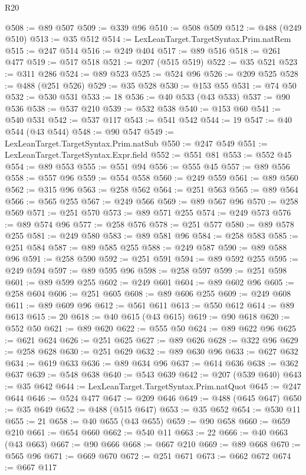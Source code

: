 \begin{lexlean}{R20}
\begin{coremodule}
@508 := @89 @507
@509 := @339 @96
@510 := @508 @509
@512 := @488 (@249 @510)
@513 := @35 @512
@514 := LexLeanTarget.TargetSyntax.Prim.natRem
@515 := @247 @514
@516 := @249 @404
@517 := @89 @516
@518 := @261 @477
@519 := @517 @518
@521 := @207 (@515 @519)
@522 := @35 @521
@523 := @311 @286
@524 := @89 @523
@525 := @524 @96
@526 := @209 @525
@528 := @488 (@251 @526)
@529 := @35 @528
@530 := @153 @55
@531 := @74 @50
@532 := @530 @531
@533 := 18
@536 := @40 @533 (@43 @533)
@537 := @90 @536
@538 := @537 @210
@539 := @532 @538
@540 := @153 @60
@541 := @540 @531
@542 := @537 @117
@543 := @541 @542
@544 := 19
@547 := @40 @544 (@43 @544)
@548 := @90 @547
@549 := LexLeanTarget.TargetSyntax.Prim.natSub
@550 := @247 @549
@551 := LexLeanTarget.TargetSyntax.Expr.field
@552 := @551 @81
@553 := @552 @45
@554 := @89 @553
@555 := @551 @94
@556 := @555 @45
@557 := @89 @556
@558 := @557 @96
@559 := @554 @558
@560 := @249 @559
@561 := @89 @560
@562 := @315 @96
@563 := @258 @562
@564 := @251 @563
@565 := @89 @564
@566 := @565 @255
@567 := @249 @566
@569 := @89 @567 @96
@570 := @258 @569
@571 := @251 @570
@573 := @89 @571 @255
@574 := @249 @573
@576 := @89 @574 @96
@577 := @258 @576
@578 := @251 @577
@580 := @89 @578 @255
@581 := @249 @580
@583 := @89 @581 @96
@584 := @258 @583
@585 := @251 @584
@587 := @89 @585 @255
@588 := @249 @587
@590 := @89 @588 @96
@591 := @258 @590
@592 := @251 @591
@594 := @89 @592 @255
@595 := @249 @594
@597 := @89 @595 @96
@598 := @258 @597
@599 := @251 @598
@601 := @89 @599 @255
@602 := @249 @601
@604 := @89 @602 @96
@605 := @258 @604
@606 := @251 @605
@608 := @89 @606 @255
@609 := @249 @608
@611 := @89 @609 @96
@612 := @561 @611
@613 := @550 @612
@614 := @89 @613
@615 := 20
@618 := @40 @615 (@43 @615)
@619 := @90 @618
@620 := @552 @50
@621 := @89 @620
@622 := @555 @50
@624 := @89 @622 @96
@625 := @621 @624
@626 := @251 @625
@627 := @89 @626
@628 := @322 @96
@629 := @258 @628
@630 := @251 @629
@632 := @89 @630 @96
@633 := @627 @632
@634 := @619 @633
@636 := @89 @634 @96
@637 := @614 @636
@638 := @362 @637
@639 := @548 @638
@640 := @543 @639
@642 := @207 (@539 @640)
@643 := @35 @642
@644 := LexLeanTarget.TargetSyntax.Prim.natQuot
@645 := @247 @644
@646 := @524 @477
@647 := @209 @646
@649 := @488 (@645 @647)
@650 := @35 @649
@652 := @488 (@515 @647)
@653 := @35 @652
@654 := @530 @11
@655 := 21
@658 := @40 @655 (@43 @655)
@659 := @90 @658
@660 := @659 @210
@661 := @654 @660
@662 := @540 @11
@663 := 22
@666 := @40 @663 (@43 @663)
@667 := @90 @666
@668 := @667 @210
@669 := @89 @668
@670 := @565 @96
@671 := @669 @670
@672 := @251 @671
@673 := @662 @672
@674 := @667 @117

\end{coremodule}
\end{lexlean}
